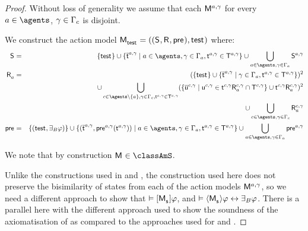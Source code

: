 \begin{proof}
Without loss of generality we assume that each $\aModel[\agentA, \gamma]$ for every $\agentA \in \agents$, $\gamma \in \Gamma_\agentC$ is disjoint.

We construct the action model $\aPModelAndTuple{\aStateTest}$ where:
\begin{eqnarray*}
    \aStates &=& \{\aStateTest\} \cup \{\aPStateT[\agentA, \gamma] \mid \agentA \in \agents, \gamma \in \Gamma_\agentA, \aStateT[\agentA, \gamma] \in \aStatesT[\agentA, \gamma]\} \cup \bigcup_{\agentA \in \agents, \gamma \in \Gamma_\agentA} \aStates[\agentA, \gamma]\\
    \aAccessibilityA &=& (\{\aStateTest\} \cup \{\aPStateT[\agentA, \gamma] \mid \gamma \in \Gamma_\agentA, \aStateT[\agentA, \gamma] \in \aStatesT[\agentA, \gamma]\})^2\\&&\quad \cup \bigcup_{\agentC \in \agents \setminus \{\agentA\}, \gamma \in \Gamma_\agentC, \aStateT[\agentC, \gamma] \in \aStatesT[\agentC, \gamma]} (\{\aPStateU[\agentC, \gamma] \mid \aStateU[\agentC, \gamma] \in \aSuccessorsA[\agentC, \gamma]{\aStateT[\agentC, \gamma]} \cap \aStatesT[\agentC, \gamma]\} \cup \aSuccessorsA[\agentC, \gamma]{\aStateT[\agentC, \gamma]})^2 \\&&\quad\cup \bigcup_{\agentC \in \agents, \gamma \in \Gamma_\agentC} \aAccessibilityA[\agentC, \gamma]\\
    \aPrecondition &=& \{(\aStateTest, \someactsBs \phi)\} \cup \{(\aPStateT[\agentA, \gamma], \aPrecondition[\agentA, \gamma](\aStateT[\agentA, \gamma])) \mid \agentA \in \agents, \gamma \in \Gamma_\agentA, \aStateT[\agentA, \gamma] \in \aStatesT[\agentA, \gamma]\} \cup \bigcup_{\agentA \in \agents, \gamma \in \Gamma_\agentA} \aPrecondition[\agentA, \gamma]
\end{eqnarray*}

We note that by construction $\aModel \in \classAmS$.


Unlike the constructions used in \logicAamlK{} and \logicAamlKFF{}, the construction used here does not preserve the bisimilarity of states from each of the action models $\aModel[\agentA, \gamma]$, so we need a different approach to show that $\entails \actionA{\aPModel{\aStateS}} \phi$, and $\entails \actionE{\aPModel{\aStateS}} \phi \iff \someactsBs \phi$.
There is a parallel here with the different approach used to show the soundness of the axiomatisation of \logicRmlS{} as compared to the approaches used for \logicRmlK{} and \logicRmlKFF{}.


\end{proof}

